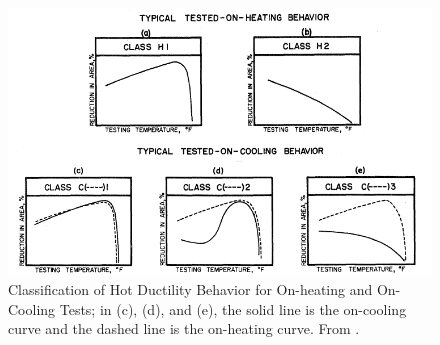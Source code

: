 \begin{figure}[h]
\centering
\includegraphics[width=6in]{figures/nippes-criteria.png}
\caption{Classification of Hot Ductility Behavior for On-heating and On-Cooling Tests; in (c), (d), and (e), the solid line is the on-cooling curve and the dashed line is the on-heating curve.  From \citet[Fig.~66]{nippes_further_1957}.}
\label{fig:nippes-criteria}
\end{figure}


